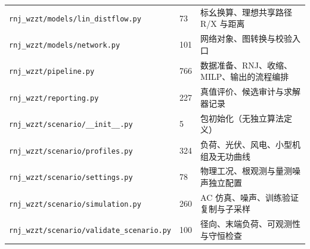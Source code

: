 \begin{longtable}{P{8.0cm}P{0.8cm}P{6.0cm}}
\nolinkurl{rnj_wzzt/models/lin_distflow.py} & 73 & 标幺换算、理想共享路径 R/X 与距离 \\
\nolinkurl{rnj_wzzt/models/network.py} & 101 & 网络对象、图转换与校验入口 \\
\nolinkurl{rnj_wzzt/pipeline.py} & 766 & 数据准备、RNJ、收缩、MILP、输出的流程编排 \\
\nolinkurl{rnj_wzzt/reporting.py} & 227 & 真值评价、候选审计与求解器记录 \\
\nolinkurl{rnj_wzzt/scenario/__init__.py} & 5 & 包初始化（无独立算法定义） \\
\nolinkurl{rnj_wzzt/scenario/profiles.py} & 324 & 负荷、光伏、风电、小型机组及无功曲线 \\
\nolinkurl{rnj_wzzt/scenario/settings.py} & 78 & 物理工况、根观测与量测噪声独立配置 \\
\nolinkurl{rnj_wzzt/scenario/simulation.py} & 260 & AC 仿真、噪声、训练验证复制与子采样 \\
\nolinkurl{rnj_wzzt/scenario/validate_scenario.py} & 100 & 径向、末端负荷、可观测性与守恒检查 \\
\bottomrule\end{longtable}
